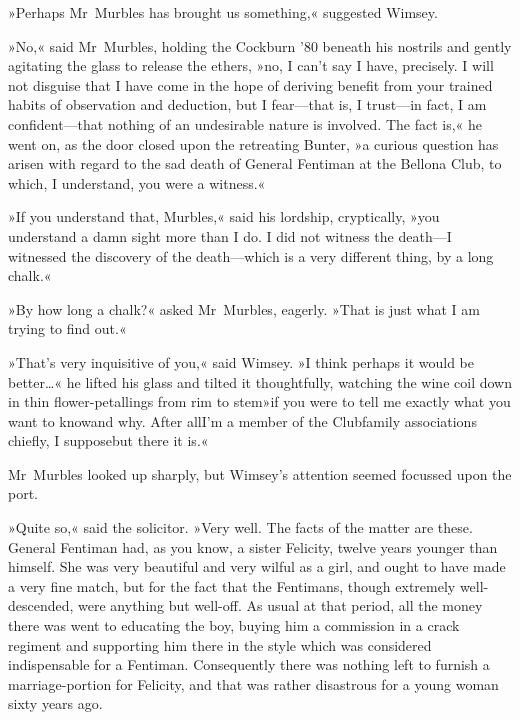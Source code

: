 »Perhaps Mr~Murbles has brought us something,« suggested Wimsey.

»No,« said Mr~Murbles, holding the Cockburn '80 beneath his nostrils and gently agitating the glass to release the ethers, »no, I can't say I have, precisely. I will not disguise that I have come in the hope of deriving benefit from your trained habits of observation and deduction, but I fear—that is, I trust—in fact, I am confident—that nothing of an undesirable nature is involved. The fact is,« he went on, as the door closed upon the retreating Bunter, »a curious question has arisen with regard to the sad death of General Fentiman at the Bellona Club, to which, I understand, you were a witness.«

»If you understand that, Murbles,« said his lordship, cryptically, »you understand a damn sight more than I do. I did not witness the death—I witnessed the discovery of the death—which is a very different thing, by a long chalk.«

»By how long a chalk?« asked Mr~Murbles, eagerly. »That is just what I am trying to find out.«

»That's very inquisitive of you,« said Wimsey. »I think perhaps it would be better\dots« he lifted his glass and tilted it thoughtfully, watching the wine coil down in thin flower-petallings from rim to stem\textellipsis  »if you were to tell me exactly what you want to know\textellipsis  and why. After all\textellipsis  I'm a member of the Club\textellipsis  family associations chiefly, I suppose\textellipsis  but there it is.«

Mr~Murbles looked up sharply, but Wimsey's attention seemed focussed upon the port.

»Quite so,« said the solicitor. »Very well. The facts of the matter are these. General Fentiman had, as you know, a sister Felicity, twelve years younger than himself. She was very beautiful and very wilful as a girl, and ought to have made a very fine match, but for the fact that the Fentimans, though extremely well-descended, were anything but well-off. As usual at that period, all the money there was went to educating the boy, buying him a commission in a crack regiment and supporting him there in the style which was considered indispensable for a Fentiman. Consequently there was nothing left to furnish a marriage-portion for Felicity, and that was rather disastrous for a young woman sixty years ago.

